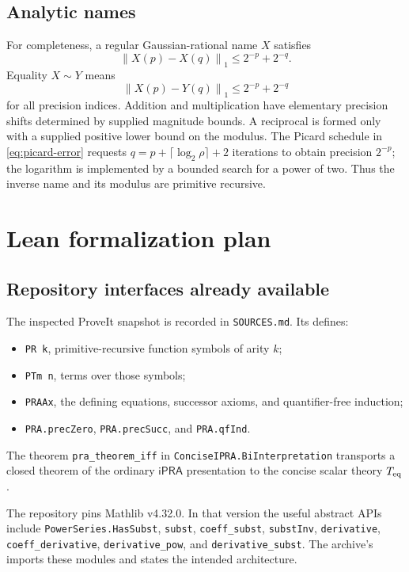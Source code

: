 \documentclass[11pt]{article}
\theoremstyle{definition}
\newcommand{\ipra}{\mathsf{iPRA}}
\newcommand{\norm}[1]{\left\lVert#1\right\rVert}
\newcommand{\code}[1]{\texttt{#1}}
\begin{document}
\subsection{Analytic names}

For completeness, a regular Gaussian-rational name \(X\) satisfies
\[
 \norm{X(p)-X(q)}_1\le2^{-p}+2^{-q}.
\]
Equality \(X\sim Y\) means
\[
 \norm{X(p)-Y(q)}_1\le2^{-p}+2^{-q}
\]
for all precision indices.  Addition and multiplication have elementary
precision shifts determined by supplied magnitude bounds.  A reciprocal is
formed only with a supplied positive lower bound on the modulus.  The Picard
schedule in \eqref{eq:picard-error} requests
\(q=p+\lceil\log_2\rho\rceil+2\) iterations to obtain precision \(2^{-p}\);
the logarithm is implemented by a bounded search for a power of two.  Thus the
inverse name and its modulus are primitive recursive.

\section{Lean formalization plan}\label{sec:lean}

\subsection{Repository interfaces already available}

The inspected ProveIt snapshot is recorded in \code{SOURCES.md}.  Its
 defines:
\begin{itemize}
\item \code{PR k}, primitive-recursive function symbols of arity \(k\);
\item \code{PTm n}, terms over those symbols;
\item \code{PRAAx}, the defining equations, successor axioms, and
quantifier-free induction;
\item \code{PRA.precZero}, \code{PRA.precSucc}, and \code{PRA.qfInd}.
\end{itemize}
The theorem \code{pra\_theorem\_iff} in
\code{ConciseIPRA.BiInterpretation} transports a closed theorem of the ordinary
\(\ipra\) presentation to the concise scalar theory \(T_{\rm eq}\).

The repository pins Mathlib v4.32.0.  In that version the useful abstract APIs
include \code{PowerSeries.HasSubst}, \code{subst}, \code{coeff\_subst},
\code{substInv}, \code{derivative}, \code{coeff\_derivative},
\code{derivative\_pow}, and \code{derivative\_subst}.  The archive's
 imports these modules and states the
intended architecture.
\end{document}
